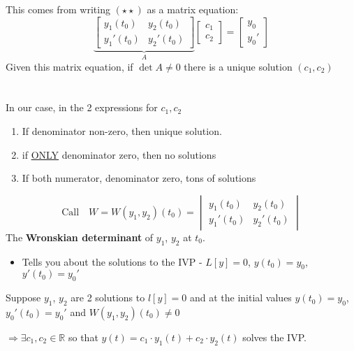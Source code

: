 This comes from writing $(\star \star)$ as a matrix equation:
\begin{equation*}
	\underbrace{\begin{bmatrix}
		y_1(t_0) & y_2(t_0) \\
		y_1'(t_0) & y_2' (t_0)
	\end{bmatrix}}_{A}
	\begin{bmatrix}
		c_1\\
		c_2
	\end{bmatrix}
	=
	\begin{bmatrix}
		y_0\\
		y_0'
	\end{bmatrix}
\end{equation*}
Given this matrix equation, if $\det A \neq 0$ there is a unique solution $(c_1, c_2)$\\
\redhline\\\\
In our case, in the 2 expressions for $c_1, c_2$
\begin{enumerate}[label=\protect\circled{\Roman*}]
	\item If denominator non-zero, then unique solution.
	\item if \underline{ONLY} denominator zero, then no solutions
	\item If both numerator, denominator zero, tons of solutions
\end{enumerate}
\begin{equation*}
	\text{Call} \quad W = W(y_1, y_2)(t_0) = 
	\begin{vmatrix}
		y_1(t_0) & y_2(t_0) \\
		y_1'(t_0) & y_2' (t_0)
	\end{vmatrix}
\end{equation*}
The \textbf{Wronskian determinant} of $y_1$, $y_2$ at $t_0$.
\begin{itemize}
	\item Tells you about the solutions to the IVP - $L[y] = 0$, $y(t_0) = y_0$, $y'(t_0) = y_0'$
\end{itemize}
\redhline
\begin{theorem-N}
	Suppose $y_1$, $y_2$ are 2 solutions to $l[y] = 0$ and at the initial values $y(t_0) = y_0$, $y_0'(t_0) = y_0'$ and $W(y_1, y_2)(t_0) \neq 0$
	\begin{center}
		$\Rightarrow \exists c_1, c_2 \in \mathbb{R}$ so that $y(t) = c_1 \cdot y_1(t) + c_2 \cdot y_2(t)$ solves the IVP.
	\end{center}
\end{theorem-N}

